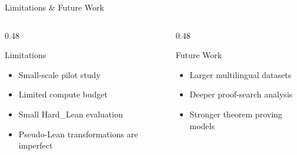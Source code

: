 \documentclass[aspectratio=169]{beamer}
\begin{document}
\begin{frame}{Limitations \& Future Work}

\centering

\vspace{0.45cm}

\begin{columns}[T,onlytextwidth]

\begin{column}{0.48\textwidth}

\begin{block}{Limitations}

\vspace{0.15cm}

\begin{itemize}
    \item Small-scale pilot study
    \vspace{0.18cm}

    \item Limited compute budget
    \vspace{0.18cm}

    \item Small Hard\_Lean evaluation
    \vspace{0.18cm}

    \item Pseudo-Lean transformations are imperfect
\end{itemize}

\end{block}

\end{column}

\begin{column}{0.48\textwidth}

\begin{block}{Future Work}

\vspace{0.15cm}

\begin{itemize}
    \item Larger multilingual datasets
    \vspace{0.18cm}

    \item Deeper proof-search analysis
    \vspace{0.18cm}

    \item Stronger theorem proving models
\end{itemize}


\end{block}
\end{column}
\end{columns}
\end{frame}
\end{document}
